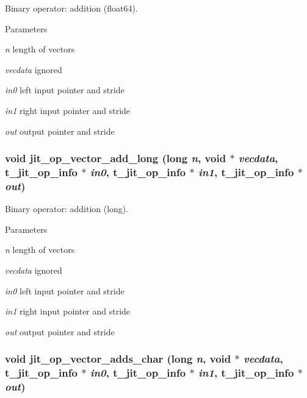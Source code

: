 Binary operator: addition (float64). 
\begin{DoxyParams}{Parameters}
\item[{\em n}]length of vectors \item[{\em vecdata}]ignored \item[{\em in0}]left input pointer and stride \item[{\em in1}]right input pointer and stride \item[{\em out}]output pointer and stride \end{DoxyParams}
\hypertarget{group__opvecmod_ga895cbfbc2d6e888797444c1b89a1a35a}{
\subsubsection[{jit\_\-op\_\-vector\_\-add\_\-long}]{\setlength{\rightskip}{0pt plus 5cm}void jit\_\-op\_\-vector\_\-add\_\-long (long {\em n}, \/  void $\ast$ {\em vecdata}, \/  {\bf t\_\-jit\_\-op\_\-info} $\ast$ {\em in0}, \/  {\bf t\_\-jit\_\-op\_\-info} $\ast$ {\em in1}, \/  {\bf t\_\-jit\_\-op\_\-info} $\ast$ {\em out})}}
\label{group__opvecmod_ga895cbfbc2d6e888797444c1b89a1a35a}


Binary operator: addition (long). 
\begin{DoxyParams}{Parameters}
\item[{\em n}]length of vectors \item[{\em vecdata}]ignored \item[{\em in0}]left input pointer and stride \item[{\em in1}]right input pointer and stride \item[{\em out}]output pointer and stride \end{DoxyParams}
\hypertarget{group__opvecmod_ga3a5f3fe93afa4f4042a943de3ec0124f}{
\subsubsection[{jit\_\-op\_\-vector\_\-adds\_\-char}]{\setlength{\rightskip}{0pt plus 5cm}void jit\_\-op\_\-vector\_\-adds\_\-char (long {\em n}, \/  void $\ast$ {\em vecdata}, \/  {\bf t\_\-jit\_\-op\_\-info} $\ast$ {\em in0}, \/  {\bf t\_\-jit\_\-op\_\-info} $\ast$ {\em in1}, \/  {\bf t\_\-jit\_\-op\_\-info} $\ast$ {\em out})}}
\label{group__opvecmod_ga3a5f3fe93afa4f4042a943de3ec0124f}


